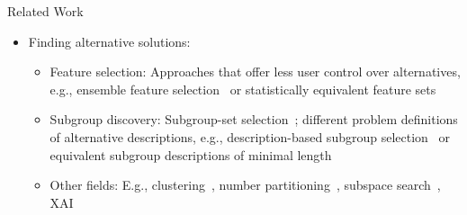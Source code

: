 \documentclass[en, navbarinline, handout]{sdqbeamer}
\begin{document}
\begin{frame}[t]{Related Work}
\begin{itemize}
\begin{itemize}
		\end{itemize}
		\vspace{\baselineskip}
		\item Finding alternative solutions:
		\begin{itemize}
			\item Feature selection: Approaches that offer less user control over alternatives, e.g., ensemble feature selection~\cite{guru2018alternative, shekar2017diverse} or statistically equivalent feature sets~\cite{borboudakis2021extending, lagani2017feature}
			\item Subgroup discovery: Subgroup-set selection~\cite{lucas2018ssdp+, proencca2022robust}; different problem definitions of alternative descriptions, e.g., description-based subgroup selection~\cite{leeuwen2012diverse} or equivalent subgroup descriptions of minimal length~\cite{boley2009non}
			\item Other fields: E.g., clustering~\cite{bailey2014alternative}, number partitioning~\cite{lawrinenko2017identical}, subspace search~\cite{fouche2021efficient}, XAI~\cite{mothilal2020explaining}
		\end{itemize}
	\end{itemize}
\end{frame}
\end{document}
